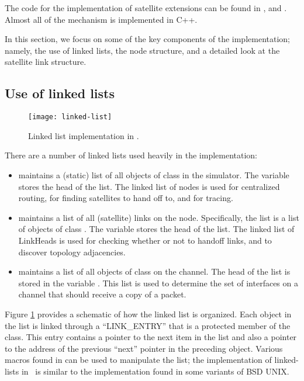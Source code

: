 The code for the implementation of satellite extensions can be found
in , and
.  Almost all of the mechanism is implemented
in C++.

In this section, we focus on some of the key components of the implementation;
namely, the use of linked lists, the node structure, and a detailed look
at the satellite link structure.

\subsection{Use of linked lists}
\label{sec:satellite/implementation/list}

\begin{figure}
    \centerline{\texttt{[image: linked-list]}}
    \caption{Linked list implementation in \ns.}
    \label{fig:linked-list}
\end{figure}

There are a number of linked lists used heavily in the implementation:
\begin{itemize}

\item {} maintains a (static) list of all objects of class
 in the simulator.  The variable  stores
the head of the list.  The linked list of nodes is used for centralized
routing, for finding satellites to hand off to, and for tracing.

\item {} maintains a list of all (satellite) links on the
node.  Specifically, the list is a list of objects of class . 
The variable  stores the head of the list.  The
linked list of LinkHeads is used for checking whether or not to handoff
links, and to discover topology adjacencies.

\item {} maintains a list of all objects of class
 on the channel.  The head of the list is stored in the variable
.  This list is used to determine the set of interfaces on a
channel that should receive a copy of a packet.
\end{itemize}

Figure \ref{fig:linked-list} provides a schematic of how the linked list
is organized.  Each object in the list is linked through a ``LINK\_ENTRY''
that is a protected member of the class.  This entry contains a pointer
to the next item in the list and also a pointer to the address of the
previous ``next'' pointer in the preceding object.   Various macros
found in  can be used to manipulate the list; the 
implementation of linked-lists in \ns~is similar to the  
implementation found in some variants of BSD UNIX.

